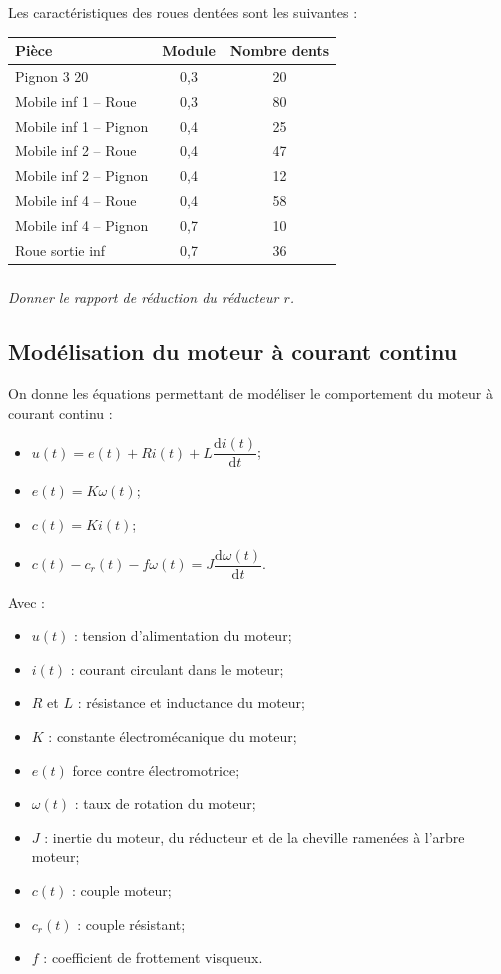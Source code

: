 \documentclass[10pt,fleqn]{article} %
\begin{document}
\begin{multicols}{2}
Les caractéristiques des roues dentées sont les suivantes : 
\begin{center}
\begin{tabular}{|l|c|c|}
\hline
Pièce & Module & Nombre dents \\ \hline
Pignon 3 20              & 0,3 & 20 \\ \hline
Mobile inf 1 -- Roue    & 0,3 & 80 \\ \hline
Mobile inf 1 -- Pignon  & 0,4 & 25 \\ \hline
Mobile inf 2 -- Roue    & 0,4 & 47 \\ \hline
Mobile inf 2 -- Pignon  & 0,4 & 12 \\ \hline
Mobile inf 4 -- Roue    & 0,4 & 58 \\ \hline
Mobile inf 4 -- Pignon   & 0,7 & 10 \\ \hline
Roue sortie inf          & 0,7 & 36 \\ \hline
\end{tabular}
\end{center}


\subparagraph{}\textit{Donner le rapport de réduction du réducteur $r$.}

\subsection*{Modélisation du moteur à courant continu}
On donne les équations permettant de modéliser le comportement du moteur à courant continu :
\begin{itemize}
\item $u(t) = e(t)+ Ri(t) +L \dfrac{\text{d}i(t)}{\text{d} t}$;
\item $e(t)=K\omega(t)$;
\item $c(t)=Ki(t)$;
\item $c(t)-c_r(t) - f\omega(t)=J\dfrac{\text{d}\omega(t)}{\text{d} t}$.
\end{itemize}

Avec :
\begin{itemize}
\item $u(t)$ : tension d'alimentation du moteur;
\item $i(t)$ : courant circulant dans le moteur;
\item $R$ et $L$ : résistance et inductance du moteur;
\item $K$ : constante électromécanique du moteur;
\item $e(t)$ force contre électromotrice;
\item $\omega(t)$ : taux de rotation du moteur;
\item $J$ : inertie du moteur, du réducteur et de la cheville ramenées à l'arbre moteur;
\item $c(t)$ : couple moteur; 
\item $c_r(t)$ : couple résistant; 
\item $f$ : coefficient de frottement visqueux.
\end{itemize}




\end{multicols}
\end{document}
